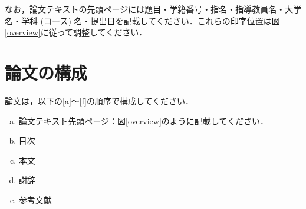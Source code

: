 \documentclass[12pt]{kupaper}
\begin{document}
なお，論文テキストの先頭ページには題目・学籍番号・指名・指導教員名・大学名・学科 (コース) 名・提出日を記載してください．これらの印字位置は図\ref{overview}に従って調整してください．


\chapter{論文の構成} \label{論文の構成}
論文は，以下の\ref{a}～\ref{f}の順序で構成してください．



\begin{enumerate}[a.]
	\item 論文テキスト先頭ページ：図\ref{overview}のように記載してください．\label{a}
	\item 目次\label{c}
	\item 本文\label{d}
	\item 謝辞\label{e}
	\item 参考文献\label{f}
\end{enumerate}
\end{document}
